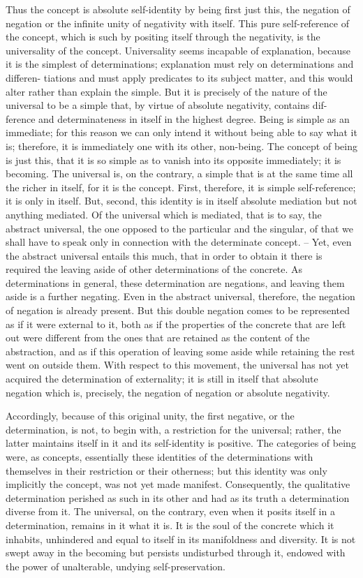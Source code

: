 Thus the concept is absolute self-identity by being first just this, the
negation of negation or the infinite unity of negativity with itself. This
pure self-reference of the concept, which is such by positing itself through
the negativity, is the universality of the concept.
Universality seems incapable of explanation, because it is the simplest
of determinations; explanation must rely on determinations and differen-
tiations and must apply predicates to its subject matter, and this would
alter rather than explain the simple. But it is precisely of the nature of the
universal to be a simple that, by virtue of absolute negativity, contains dif-
ference and determinateness in itself in the highest degree. Being is simple
as an immediate; for this reason we can only intend it without being able
to say what it is; therefore, it is immediately one with its other, non-being.
The concept of being is just this, that it is so simple as to vanish into its
opposite immediately; it is becoming. The universal is, on the contrary, a
simple that is at the same time all the richer in itself, for it is the concept.
First, therefore, it is simple self-reference; it is only in itself. But, second,
this identity is in itself absolute mediation but not anything mediated. Of
the universal which is mediated, that is to say, the abstract universal, the one
opposed to the particular and the singular, of that we shall have to speak
only in connection with the determinate concept. – Yet, even the abstract
universal entails this much, that in order to obtain it there is required the
leaving aside of other determinations of the concrete. As determinations in
general, these determination are negations, and leaving them aside is a further
negating. Even in the abstract universal, therefore, the negation of negation
is already present. But this double negation comes to be represented as if
it were external to it, both as if the properties of the concrete that are left
out were different from the ones that are retained as the content of the
abstraction, and as if this operation of leaving some aside while retaining
the rest went on outside them. With respect to this movement, the universal
has not yet acquired the determination of externality; it is still in itself that
absolute negation which is, precisely, the negation of negation or absolute
negativity.

Accordingly, because of this original unity, the first negative, or the
determination, is not, to begin with, a restriction for the universal; rather,
the latter maintains itself in it and its self-identity is positive. The categories
of being were, as concepts, essentially these identities of the determinations
with themselves in their restriction or their otherness; but this identity was
only implicitly the concept, was not yet made manifest. Consequently, the
qualitative determination perished as such in its other and had as its truth
a determination diverse from it. The universal, on the contrary, even when
it posits itself in a determination, remains in it what it is. It is the soul
of the concrete which it inhabits, unhindered and equal to itself in its
manifoldness and diversity. It is not swept away in the becoming but persists
undisturbed through it, endowed with the power of unalterable, undying
self-preservation.


